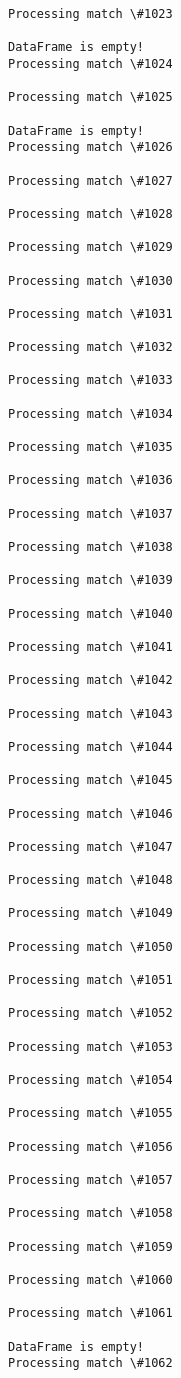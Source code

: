 \documentclass[11pt]{article}
\begin{document}
\begin{Verbatim}[commandchars=\\\{\}]
Processing match \#1023

DataFrame is empty!
Processing match \#1024

Processing match \#1025

DataFrame is empty!
Processing match \#1026

Processing match \#1027

Processing match \#1028

Processing match \#1029

Processing match \#1030

Processing match \#1031

Processing match \#1032

Processing match \#1033

Processing match \#1034

Processing match \#1035

Processing match \#1036

Processing match \#1037

Processing match \#1038

Processing match \#1039

Processing match \#1040

Processing match \#1041

Processing match \#1042

Processing match \#1043

Processing match \#1044

Processing match \#1045

Processing match \#1046

Processing match \#1047

Processing match \#1048

Processing match \#1049

Processing match \#1050

Processing match \#1051

Processing match \#1052

Processing match \#1053

Processing match \#1054

Processing match \#1055

Processing match \#1056

Processing match \#1057

Processing match \#1058

Processing match \#1059

Processing match \#1060

Processing match \#1061

DataFrame is empty!
Processing match \#1062


\end{Verbatim}
\end{document}
